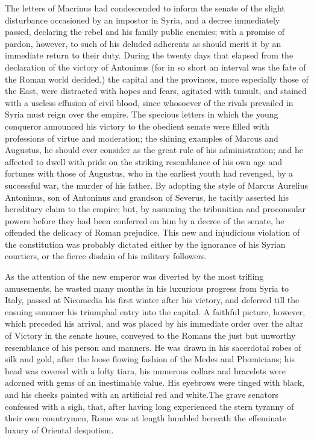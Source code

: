

The letters of Macrinus had condescended to inform the senate of
the slight disturbance occasioned by an impostor in Syria, and a
decree immediately passed, declaring the rebel and his family
public enemies; with a promise of pardon, however, to such of his
deluded adherents as should merit it by an immediate return to
their duty. During the twenty days that elapsed from the
declaration of the victory of Antoninus (for in so short an
interval was the fate of the Roman world decided,) the capital
and the provinces, more especially those of the East, were
distracted with hopes and fears, agitated with tumult, and
stained with a useless effusion of civil blood, since whosoever
of the rivals prevailed in Syria must reign over the empire. The
specious letters in which the young conqueror announced his
victory to the obedient senate were filled with professions of
virtue and moderation; the shining examples of Marcus and
Augustus, he should ever consider as the great rule of his
administration; and he affected to dwell with pride on the
striking resemblance of his own age and fortunes with those of
Augustus, who in the earliest youth had revenged, by a successful
war, the murder of his father. By adopting the style of Marcus
Aurelius Antoninus, son of Antoninus and grandson of Severus, he
tacitly asserted his hereditary claim to the empire; but, by
assuming the tribunitian and proconsular powers before they had
been conferred on him by a decree of the senate, he offended the
delicacy of Roman prejudice. This new and injudicious violation
of the constitution was probably dictated either by the ignorance
of his Syrian courtiers, or the fierce disdain of his military
followers.\footnotemark[50]


As the attention of the new emperor was diverted by the most
trifling amusements, he wasted many months in his luxurious
progress from Syria to Italy, passed at Nicomedia his first
winter after his victory, and deferred till the ensuing summer
his triumphal entry into the capital. A faithful picture,
however, which preceded his arrival, and was placed by his
immediate order over the altar of Victory in the senate house,
conveyed to the Romans the just but unworthy resemblance of his
person and manners. He was drawn in his sacerdotal robes of silk
and gold, after the loose flowing fashion of the Medes and
Phœnicians; his head was covered with a lofty tiara, his numerous
collars and bracelets were adorned with gems of an inestimable
value. His eyebrows were tinged with black, and his cheeks
painted with an artificial red and white.\footnotemark[51] The grave senators
confessed with a sigh, that, after having long experienced the
stern tyranny of their own countrymen, Rome was at length humbled
beneath the effeminate luxury of Oriental despotism.

